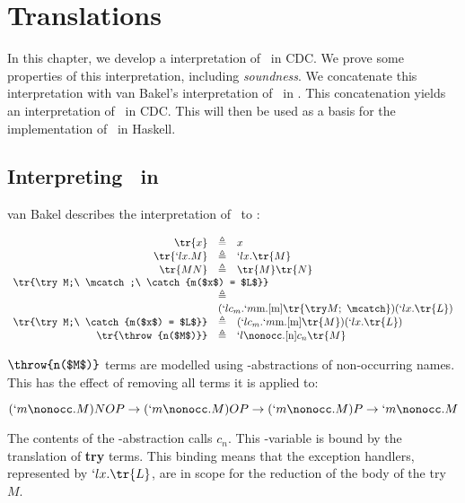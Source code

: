 \chapter{Translations}


In this chapter, we develop a interpretation of \lmu\ in CDC.
We prove some properties of this interpretation, including \emph{soundness}.
We concatenate this interpretation with van Bakel's interpretation of \ltry\ in \lmu.
This concatenation yields an interpretation of \ltry\ in CDC.
This will then be used as a basis for the implementation of \ltry\ in Haskell.

\section{Interpreting \ltry\ in \lmu}

van Bakel describes the interpretation of \ltry\ to \lmu:

{
\[
  \begin{array}{rcl}
    \tr{x} &\triangleq& x \\
    \tr{`lx.M} &\triangleq& `lx.\tr{M} \\
    \tr{M N} &\triangleq& \tr{M}\tr{N} \\
    \multicolumn{3}{l}{\tr{\try M;\ \mcatch;\ \catch{m($x$) = $L$}}} \\
    & \triangleq & \\
    &\multicolumn{2}{l}{ (`lc_m.`m\text{m}.[\text{m}]\tr{\try M;\ \mcatch})(`lx.\tr{L})} \\
    
    \tr{\try M;\ \catch{m($x$) = $L$}} & \triangleq & (`lc_m.`m\text{m}.[\text{m}]\tr{M})(`lx.\tr{L}) \\
    \tr{\throw{n($M$)}} &\triangleq& `l\nonocc.[\text{n}]c_n\tr{M}
  \end{array}
\]
}

$\throw{n($M$)}$ terms are modelled using \lmu-abstractions of non-occurring names. This has the effect of removing all terms it is applied to:

\[
  (`m\nonocc.M)NOP \to (`m\nonocc.M)OP \to (`m\nonocc.M)P \to `m\nonocc.M
\]

The contents of the \lmu-abstraction calls $c_n$.
This \lam-variable is bound by the translation of \textbf{try} terms.
This binding means that the exception handlers, represented by $`lx.\tr{L}$,
are in scope for the reduction of the body of the try $M$.

